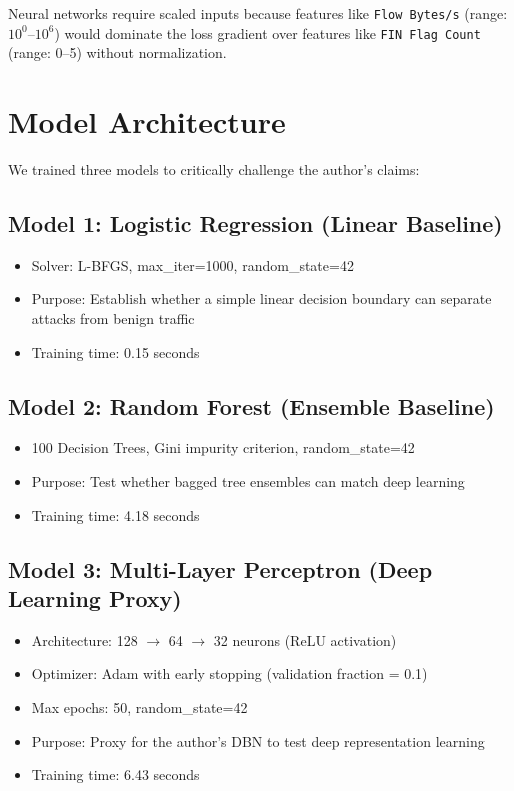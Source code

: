 \documentclass[11pt,a4paper]{article}
\begin{document}
Neural networks require scaled inputs because features like \texttt{Flow Bytes/s} (range: $10^0$--$10^6$) would dominate the loss gradient over features like \texttt{FIN Flag Count} (range: 0--5) without normalization.

\section{Model Architecture}

We trained three models to critically challenge the author's claims:

\subsection{Model 1: Logistic Regression (Linear Baseline)}
\begin{itemize}[nosep]
    \item Solver: L-BFGS, max\_iter=1000, random\_state=42
    \item Purpose: Establish whether a simple linear decision boundary can separate attacks from benign traffic
    \item Training time: 0.15 seconds
\end{itemize}

\subsection{Model 2: Random Forest (Ensemble Baseline)}
\begin{itemize}[nosep]
    \item 100 Decision Trees, Gini impurity criterion, random\_state=42
    \item Purpose: Test whether bagged tree ensembles can match deep learning
    \item Training time: 4.18 seconds
\end{itemize}

\subsection{Model 3: Multi-Layer Perceptron (Deep Learning Proxy)}
\begin{itemize}[nosep]
    \item Architecture: 128 $\rightarrow$ 64 $\rightarrow$ 32 neurons (ReLU activation)
    \item Optimizer: Adam with early stopping (validation fraction = 0.1)
    \item Max epochs: 50, random\_state=42
    \item Purpose: Proxy for the author's DBN to test deep representation learning
    \item Training time: 6.43 seconds
\end{itemize}
\end{document}
